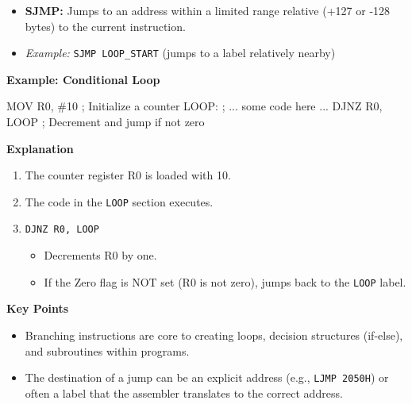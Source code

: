 \documentclass[
]{article}
\newenvironment{Shaded}{}{}
\newcommand{\NormalTok}[1]{#1}
\begin{document}
\begin{enumerate}
  \begin{itemize}
  \item
    \textbf{SJMP:} Jumps to an address within a limited range relative
    (+127 or -128 bytes) to the current instruction.
  \item
    \emph{Example:} \texttt{SJMP\ LOOP\_START} (jumps to a label
    relatively nearby)
  \end{itemize}
\end{enumerate}

\textbf{Example: Conditional Loop}

\begin{Shaded}
\begin{Highlighting}[]
\NormalTok{MOV R0, \#10    ; Initialize a counter}
\NormalTok{LOOP:}
\NormalTok{   ; ... some code here ...}
\NormalTok{   DJNZ R0, LOOP  ; Decrement and jump if not zero}
\end{Highlighting}
\end{Shaded}

\textbf{Explanation}

\begin{enumerate}
\def\labelenumi{\arabic{enumi}.}
\item
  The counter register R0 is loaded with 10.
\item
  The code in the \texttt{LOOP} section executes.
\item
  \texttt{DJNZ\ R0,\ LOOP}

  \begin{itemize}
  \item
    Decrements R0 by one.
  \item
    If the Zero flag is NOT set (R0 is not zero), jumps back to the
    \texttt{LOOP} label.
  \end{itemize}
\end{enumerate}

\textbf{Key Points}

\begin{itemize}
\item
  Branching instructions are core to creating loops, decision structures
  (if-else), and subroutines within programs.
\item
  The destination of a jump can be an explicit address (e.g.,
  \texttt{LJMP\ 2050H}) or often a label that the assembler translates
  to the correct address.
\end{itemize}
\end{document}
